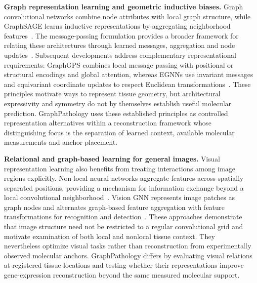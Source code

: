 \noindent\textbf{Graph representation learning and geometric inductive biases.}
Graph convolutional networks combine node attributes with local graph structure, while GraphSAGE learns inductive representations by aggregating neighborhood features~\cite{kipf2017,hamilton2017}. The message-passing formulation provides a broader framework for relating these architectures through learned messages, aggregation and node updates~\cite{gilmer2017}. Subsequent developments address complementary representational requirements: GraphGPS combines local message passing with positional or structural encodings and global attention, whereas EGNNs use invariant messages and equivariant coordinate updates to respect Euclidean transformations~\cite{rampasek2022,satorras2021}. These principles motivate ways to represent tissue geometry, but architectural expressivity and symmetry do not by themselves establish useful molecular prediction. GraphPathology uses these established principles as controlled representation alternatives within a reconstruction framework whose distinguishing focus is the separation of learned context, available molecular measurements and anchor placement.

\noindent\textbf{Relational and graph-based learning for general images.}
Visual representation learning also benefits from treating interactions among image regions explicitly. Non-local neural networks aggregate features across spatially separated positions, providing a mechanism for information exchange beyond a local convolutional neighborhood~\cite{wang2018nonlocal}. Vision GNN represents image patches as graph nodes and alternates graph-based feature aggregation with feature transformations for recognition and detection~\cite{han2022vig}. These approaches demonstrate that image structure need not be restricted to a regular convolutional grid and motivate examination of both local and nonlocal tissue context. They nevertheless optimize visual tasks rather than reconstruction from experimentally observed molecular anchors. GraphPathology differs by evaluating visual relations at registered tissue locations and testing whether their representations improve gene-expression reconstruction beyond the same measured molecular support.

